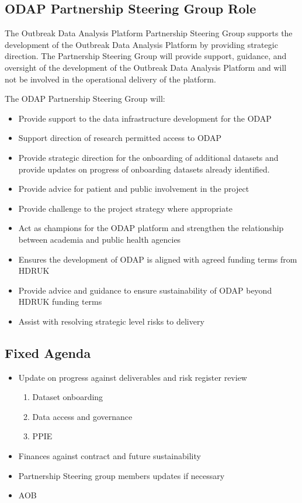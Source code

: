 \documentclass[
]{article}
\begin{document}
\hypertarget{odap-partnership-steering-group-role}{%
\subsection{ODAP Partnership Steering Group
Role}\label{odap-partnership-steering-group-role}}

The Outbreak Data Analysis Platform Partnership Steering Group supports
the development of the Outbreak Data Analysis Platform by providing
strategic direction. The Partnership Steering Group will provide
support, guidance, and oversight of the development of the Outbreak Data
Analysis Platform and will not be involved in the operational delivery
of the platform.

The ODAP Partnership Steering Group will:

\begin{itemize}
\item
  Provide support to the data infrastructure development for the ODAP
\item
  Support direction of research permitted access to ODAP
\item
  Provide strategic direction for the onboarding of additional datasets
  and provide updates on progress of onboarding datasets already
  identified.
\item
  Provide advice for patient and public involvement in the project
\item
  Provide challenge to the project strategy where appropriate
\item
  Act as champions for the ODAP platform and strengthen the relationship
  between academia and public health agencies
\item
  Ensures the development of ODAP is aligned with agreed funding terms
  from HDRUK
\item
  Provide advice and guidance to ensure sustainability of ODAP beyond
  HDRUK funding terms
\item
  Assist with resolving strategic level risks to delivery
\end{itemize}

\hypertarget{fixed-agenda}{%
\subsection{Fixed Agenda}\label{fixed-agenda}}

\begin{itemize}
\item
  Update on progress against deliverables and risk register review

  \begin{enumerate}
  \def\labelenumi{\alph{enumi}.}
  \item
    Dataset onboarding
  \item
    Data access and governance
  \item
    PPIE
  \end{enumerate}
\item
  Finances against contract and future sustainability
\item
  Partnership Steering group members updates if necessary
\item
  AOB
\end{itemize}
\end{document}
